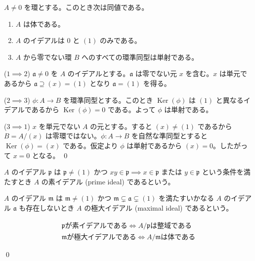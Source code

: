 \documentclass[uplatex,dvipdfmx,a4paper,11pt]{jlreq}
\makeatletter
\DeclareMathOperator{\Kernel}{Ker}
\renewcommand{\aa}{\mathfrak{a}}
\newcommand{\pp}{\mathfrak{p}}
\newcommand{\mm}{\mathfrak{m}}
\theoremstyle{definition}
\renewenvironment{proof}[1][\proofname]{\par
  \normalfont
  \topsep6\p@\@plus6\p@ \trivlist
  \item[\hskip\labelsep{\bfseries #1}\@addpunct{\bfseries}]\ignorespaces\quad\par
}{%
  \qed\endtrivlist\@endpefalse
}
\renewcommand\proofname{証明}
\makeatother
\begin{document}
\begin{proposition}
  $A\neq 0$ を環とする。このとき次は同値である。
  \begin{enumerate}
    \item $A$ は体である。
    \item $A$ のイデアルは $0$ と $(1)$ のみである。
    \item $A$ から零でない環 $B$ へのすべての環準同型は単射である。
  \end{enumerate}
\end{proposition}
\begin{proof}
  ($1 \implies 2$) $\aa \neq 0$ を $A$ のイデアルとする。$\aa$ は零でない元 $x$ を含む。$x$ は単元であるから $\aa\supseteq (x) = (1)$ となり $\aa = (1)$ を得る。

  ($2 \implies 3$) $\phi: A\to B$ を環準同型とする。このとき $\Kernel(\phi)$ は $(1)$ と異なるイデアルであるから $\Kernel(\phi) = 0$ である。よって $\phi$ は単射である。

  ($3 \implies 1$) $x$ を単元でない $A$ の元とする。すると $(x) \neq (1)$ であるから $B = A/(x)$ は零環ではない。$\phi: A\to B$ を自然な準同型とすると $\Kernel(\phi) = (x)$ である。仮定より $\phi$ は単射であるから $(x) = 0$。したがって $x = 0$ となる。
\end{proof}

\begin{definition}
  $A$ のイデアル $\pp$ は $\pp \neq (1)$ かつ $xy \in \pp \implies x\in\pp$ または $y\in\pp$ という条件を満たすとき $A$ の素イデアル (prime ideal) であるという。

  $A$ のイデアル $\mm$ は $\mm \neq (1)$ かつ $\mm\subsetneq\mathfrak{a}\subsetneq (1)$ を満たすいかなる $A$ のイデアル $\mathfrak{a}$ も存在しないとき $A$ の極大イデアル (maximal ideal) であるという。
\end{definition}

\begin{theorem}
  \begin{align}
    \pp が素イデアルである \iff A/\pp は整域である \\
    \mm が極大イデアルである \iff A/\mm は体である
  \end{align}
\end{theorem}
\begin{proof}

\end{proof}
\end{document}
